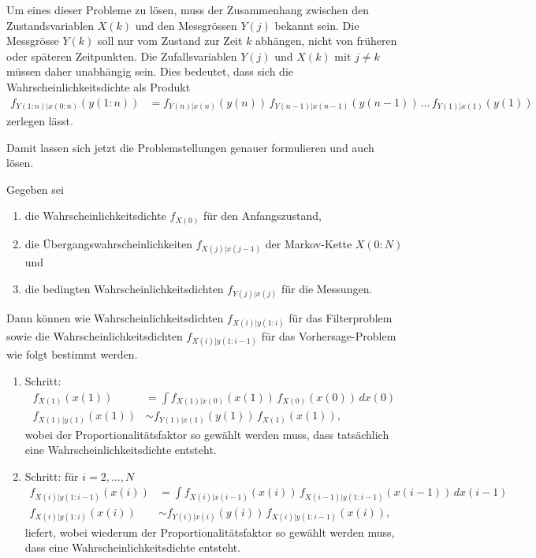 Um eines dieser Probleme zu lösen, muss der Zusammenhang zwischen den
Zustandsvariablen $X(k)$ und den Messgrössen $Y(j)$ bekannt sein.
Die Messgrösse $Y(k)$ soll nur vom Zustand zur Zeit $k$ abhängen,
nicht von früheren oder späteren Zeitpunkten.
Die Zufallsvariablen $Y(j)$ und $X(k)$ mit $j\ne k$ müssen daher
unabhängig sein.
Dies bedeutet, dass sich die Wahrscheinlichkeitsdichte als Produkt
\begin{align*}
f_{Y(1:n)|x(0:n)} (y(1:n))
&=
f_{Y(n)|x(n)}(y(n))\,
f_{Y(n-1)|x(n-1)}(y(n-1))\,
\dots\,
f_{Y(1)|x(1)}(y(1))
\end{align*}
zerlegen lässt.

Damit lassen sich jetzt die Problemstellungen genauer formulieren 
und auch lösen.

\begin{satz}
\label{satz:filter und vorhersage}
Gegeben sei
\begin{enumerate}
\item die Wahrscheinlichkeitsdichte $f_{X(0)}$ für den Anfangszustand,
\item die Übergangswahrscheinlichkeiten $f_{X(j)|x(j-1)}$ der
Markov-Kette $X(0:N)$ und
\item die bedingten Wahrscheinlichkeitsdichten $f_{Y(j)|x(j)}$ für die
Messungen.
\end{enumerate}
Dann können wie Wahrscheinlichkeitsdichten $f_{X(i)|y(1:i)}$ für das
Filterproblem sowie die Wahrscheinlichkeitsdichten $f_{X(i)|y(1:i-1)}$
für das Vorhersage-Problem wie folgt bestimmt werden.
\begin{enumerate}
\item Schritt:
\begin{align}
f_{X(1)}(x(1))
&=
\int f_{X(1)|x(0)}(x(1)) \, f_{X(0)}(x(0))\, dx(0)
\label{assim:totalstep1}
\\
f_{X(1)|y(1)}(x(1))
&\sim
f_{Y(1)|x(1)}(y(1))\, f_{X(1)}(x(1)),
\label{assim:bayesstep1}
\end{align}
wobei der Proportionalitätsfaktor so gewählt werden muss, dass tatsächlich
eine Wahrscheinlichkeitsdichte entsteht.
\item Schritt: für $i=2,\dots,N$
\begin{align}
f_{X(i)|y(1:i-1)}(x(i))
&=
\int f_{X(i)|x(i-1)}(x(i))\, f_{X(i-1)|y(1:i-1)}(x(i-1))\,dx(i-1)
\label{assim:totalstep2}
\\
f_{X(i)|y(1:i)}(x(i))
&\sim
f_{Y(i)|x(i)}(y(i))\, f_{X(i)|y(1:i-1)}(x(i)),
\label{assim:bayesstep2}
\end{align}
liefert,
wobei wiederum der Proportionalitätsfaktor so gewählt werden muss, dass
eine Wahrscheinlichkeitsdichte entsteht.
\end{enumerate}
\end{satz}

